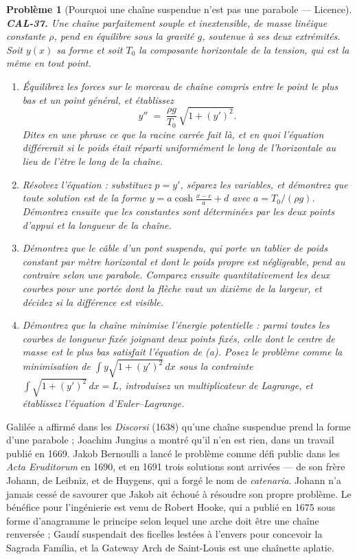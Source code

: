 \documentclass[11pt]{article}
\newtheorem{problem}{Problème}
\begin{document}
\bigskip

\begin{problem}[{Pourquoi une chaîne suspendue n'est pas une parabole --- Licence}]
\textbf{CAL-37.} Une chaîne parfaitement souple et inextensible, de masse linéique constante
$ \rho $, pend en équilibre sous la gravité $ g $, soutenue à ses deux extrémités. Soit $ y(x) $
sa forme et soit $ T_0 $ la composante horizontale de la tension, qui est la même en
tout point.
\begin{enumerate}
\item[(a)] Équilibrez les forces sur le morceau de chaîne compris entre le point le plus bas et un point général, et
établissez
\[ y'' \;=\; \frac{\rho g}{T_0}\,\sqrt{1 + (y')^2}. \]
Dites en une phrase ce que la racine carrée fait là, et en quoi l'équation différerait si
le poids était réparti uniformément le long de l'\textit{horizontale} au lieu de l'être le long de la chaîne.
\item[(b)] Résolvez l'équation : substituez $ p = y' $, séparez les variables, et démontrez que toute
solution est de la forme $ y = a\cosh\frac{x-c}{a} + d $ avec $ a = T_0/(\rho g) $. Démontrez ensuite
que les constantes sont déterminées par les deux points d'appui et la longueur de la chaîne.
\item[(c)] Démontrez que le câble d'un pont suspendu, qui porte un tablier de poids constant par
mètre horizontal et dont le poids propre est négligeable, pend au contraire selon une parabole. Comparez ensuite
quantitativement les deux courbes pour une portée dont la flèche vaut un dixième de la largeur, et décidez si
la différence est visible.
\item[(d)] Démontrez que la chaîne minimise l'énergie potentielle : parmi toutes les courbes de longueur fixée joignant
deux points fixés, celle dont le centre de masse est le plus bas satisfait l'équation de (a). Posez le
problème comme la minimisation de $ \int y\sqrt{1+(y')^2}\,dx $ sous la contrainte
$ \int \sqrt{1+(y')^2}\,dx = L $, introduisez un multiplicateur de Lagrange, et établissez
l'équation d'Euler--Lagrange.
\end{enumerate}

\end{problem}

\noindent Galilée a affirmé dans les \textit{Discorsi} (1638) qu'une chaîne suspendue prend la
forme d'une parabole ; Joachim Jungius a montré qu'il n'en est rien, dans un travail publié en 1669. Jakob
Bernoulli a lancé le problème comme défi public dans les \textit{Acta Eruditorum} en 1690, et en 1691
trois solutions sont arrivées --- de son frère Johann, de Leibniz, et de Huygens, qui a forgé le
nom de \textit{catenaria}. Johann n'a jamais cessé de savourer que Jakob ait échoué à résoudre son propre
problème. Le bénéfice pour l'ingénierie est venu de Robert Hooke, qui a publié en 1675 sous forme d'anagramme le
principe selon lequel une arche doit être une chaîne renversée ; Gaudí suspendait des ficelles lestées à l'envers pour
concevoir la Sagrada Família, et la Gateway Arch de Saint-Louis est une chaînette aplatie.
\end{document}
